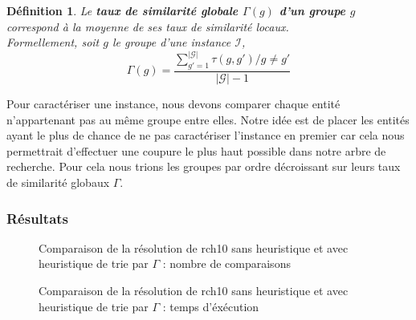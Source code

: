 \documentclass[a4paper,10pt]{article}
\newtheorem{definition}{Définition}
\begin{document}
\begin{definition}
Le \textbf{taux de similarité globale $\Gamma(g)$ d'un groupe $g$} correspond à la moyenne de ses taux de similarité locaux.\\
Formellement, soit $g$ le groupe d'une instance $\mathcal{I}$,
$$ \Gamma(g)=\frac{\sum_{g'=1}^{|\mathcal{G}|}\tau(g,g') /g \neq g'}{|\mathcal{G}|-1} $$
\end{definition}

Pour caractériser une instance, nous devons comparer chaque entité n'appartenant pas au même groupe entre elles. Notre idée est de placer les entités ayant le plus de chance de ne pas caractériser l'instance en premier car cela nous permettrait d'effectuer une coupure le plus haut possible dans notre arbre de recherche. Pour cela nous trions les groupes par ordre décroissant sur leurs taux de similarité globaux $\Gamma$.

\subsubsection*{Résultats}

\begin{figure}[H]
\begin{center}
\end{center}
\caption{Comparaison de la résolution de rch10 sans heuristique et avec heuristique de trie par $\Gamma$ : nombre de comparaisons}
\end{figure}


\begin{figure}[H]
\begin{center}
\end{center}
\caption{Comparaison de la résolution de rch10 sans heuristique et avec heuristique de trie par $\Gamma$ : temps d'éxécution}
\end{figure}
\end{document}
